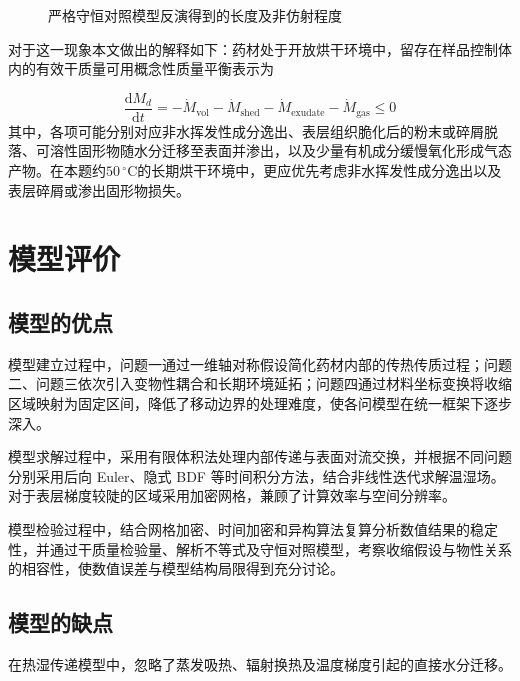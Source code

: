 \documentclass[withoutpreface,bwprint]{cumcmthesis}
\begin{document}
\begin{figure}[H]
\centering

\caption{严格守恒对照模型反演得到的长度及非仿射程度}
\label{fig:q4-inferred-length}
\end{figure}

对于这一现象本文做出的解释如下：药材处于开放烘干环境中，留存在样品控制体内的有效干质量可用概念性质量平衡表示为

\begin{equation}
\frac{\mathrm dM_d}{\mathrm dt}
=-\dot M_{\mathrm{vol}}
-\dot M_{\mathrm{shed}}
-\dot M_{\mathrm{exudate}}
-\dot M_{\mathrm{gas}}
\le0
\label{eq:q4-effective-dry-mass-balance}
\end{equation}
其中，各项可能分别对应非水挥发性成分逸出、表层组织脆化后的粉末或碎屑脱落、可溶性固形物随水分迁移至表面并渗出，以及少量有机成分缓慢氧化形成气态产物。在本题约$50\,{}^\circ\mathrm C$的长期烘干环境中，更应优先考虑非水挥发性成分逸出以及表层碎屑或渗出固形物损失。



\section{模型评价}

\subsection{模型的优点}

模型建立过程中，问题一通过一维轴对称假设简化药材内部的传热传质过程；问题二、问题三依次引入变物性耦合和长期环境延拓；问题四通过材料坐标变换将收缩区域映射为固定区间，降低了移动边界的处理难度，使各问模型在统一框架下逐步深入。

模型求解过程中，采用有限体积法处理内部传递与表面对流交换，并根据不同问题分别采用后向 Euler、隐式 BDF 等时间积分方法，结合非线性迭代求解温湿场。对于表层梯度较陡的区域采用加密网格，兼顾了计算效率与空间分辨率。

模型检验过程中，结合网格加密、时间加密和异构算法复算分析数值结果的稳定性，并通过干质量检验量、解析不等式及守恒对照模型，考察收缩假设与物性关系的相容性，使数值误差与模型结构局限得到充分讨论。

\subsection{模型的缺点}

在热湿传递模型中，忽略了蒸发吸热、辐射换热及温度梯度引起的直接水分迁移。
\end{document}
